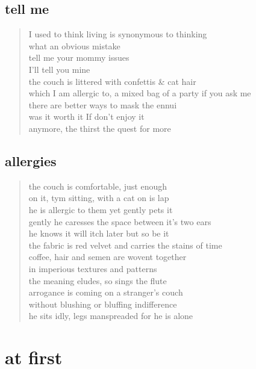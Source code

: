 \documentclass[11pt]{article}
\begin{document}
\subsection{tell me}
\label{sec:org1593c62}
\begin{verse}
I used to think living is synonymous to thinking\\
what an obvious mistake\\
tell me your mommy issues\\
I'll tell you mine\\
the couch is littered with confettis \& cat hair\\
which I am allergic to, a mixed bag of a party if you ask me\\
there are better ways to mask the ennui\\
was it worth it If don't enjoy it\\
anymore, the thirst the quest for more\\
\end{verse}
\subsection{allergies}
\label{sec:org4cb0412}
\begin{verse}
the couch is comfortable, just enough\\
on it, tym sitting, with a cat on is lap\\
he is allergic to them yet gently pets it\\
gently he caresses the space between it's two ears\\
he knows it will itch later but so be it\\
the fabric is red velvet and carries the stains of time\\
coffee, hair and semen are wovent together\\
in imperious textures and patterns\\
\vspace*{1em}
the meaning eludes, so sings the flute\\
arrogance is coming on a stranger's couch\\
without blushing or bluffing indifference\\
he sits idly, legs manspreaded for he is alone\\
\end{verse}
\section{at first}
\label{sec:orgb92be3c}
\end{document}

